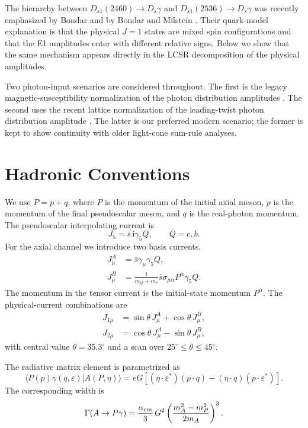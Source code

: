 \documentclass[11pt]{article}
\newcommand{\ii}{\mathrm{i}}
\newcommand{\Ds}{D_s}
\newcommand{\Dsone}{D_{s1}}
\begin{document}
The hierarchy between $\Dsone(2460)\to\Ds\gamma$ and
$\Dsone(2536)\to\Ds\gamma$ was recently emphasized by Bondar and by
Bondar and Milstein \cite{Bondar2025Why,BondarMilstein2025}.  Their
quark-model explanation is that the physical $J=1$ states are mixed spin
configurations and that the E1 amplitudes enter with different relative signs.
Below we show that the same mechanism appears directly in the LCSR
decomposition of the physical amplitudes.

Two photon-input scenarios are considered throughout.  The first is the legacy
magnetic-susceptibility normalization of the photon distribution amplitudes
\cite{Ball:2002ps,Rohrwild2007}.  The second uses the recent lattice
normalization of the leading-twist photon distribution amplitude
\cite{Bacchio2024}.  The latter is our preferred modern scenario; the former is
kept to show continuity with older light-cone sum-rule analyses.

\section{Hadronic Conventions}

We use $P=p+q$, where $P$ is the momentum of the initial axial meson, $p$ is the
momentum of the final pseudoscalar meson, and $q$ is the real-photon momentum.
The pseudoscalar interpolating current is
\begin{equation}
  J_5=\bar s\,\ii\gamma_5 Q,\qquad Q=c,b .
\end{equation}
For the axial channel we introduce two basis currents,
\begin{align}
  J^A_\mu &= \bar s\gamma_\mu\gamma_5 Q,\\
  J^B_\mu &= \frac{\ii}{m_Q+m_s}\bar s\sigma_{\mu\alpha}P^\alpha\gamma_5 Q.
  \label{eq:basis-currents}
\end{align}
The momentum in the tensor current is the initial-state momentum $P^\alpha$.
The physical-current combinations are
\begin{align}
  J_{1\mu} &= \sin\theta\,J^A_\mu+\cos\theta\,J^B_\mu,\\
  J_{2\mu} &= \cos\theta\,J^A_\mu-\sin\theta\,J^B_\mu ,
  \label{eq:physical-currents}
\end{align}
with central value $\theta=35.3^\circ$ and a scan over
$25^\circ\leq\theta\leq45^\circ$.

The radiative matrix element is parametrized as
\begin{equation}
  \langle P(p)\gamma(q,\varepsilon)|A(P,\eta)\rangle
  =
  eG\left[(\eta\cdot\varepsilon^*)(p\cdot q)
  -(\eta\cdot q)(p\cdot\varepsilon^*)\right].
  \label{eq:e1-definition}
\end{equation}
The corresponding width is
\begin{equation}
  \Gamma(A\to P\gamma)
  =
  \frac{\alpha_{\rm em}}{3}\,G^2
  \left(\frac{m_A^2-m_P^2}{2m_A}\right)^3 .
  \label{eq:width}
\end{equation}
\end{document}

